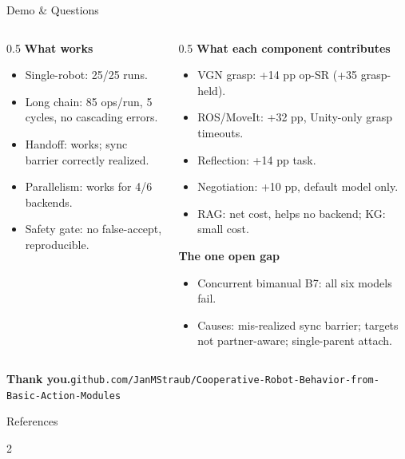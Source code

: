 \documentclass[aspectratio=169,11pt]{beamer}
\begin{document}
\begin{frame}{Demo \& Questions}
	\begin{columns}[T]
		\begin{column}{0.5\textwidth}
			\footnotesize
			\textbf{What works}
			\begin{itemize}\scriptsize
				\item Single-robot: 25/25 runs.
				\item Long chain: 85 ops/run, 5 cycles, no cascading errors.
				\item Handoff: works; sync barrier correctly realized.
				\item Parallelism: works for 4/6 backends.
				\item Safety gate: no false-accept, reproducible.
			\end{itemize}
		\end{column}
		\begin{column}{0.5\textwidth}
			\footnotesize
			\textbf{What each component contributes}
			\begin{itemize}\scriptsize
				\item VGN grasp: +14 pp op-SR (+35 grasp-held).
				\item ROS/MoveIt: +32 pp, Unity-only grasp timeouts.
				\item Reflection: +14 pp task.
				\item Negotiation: +10 pp, default model only.
				\item RAG: net cost, helps no backend; KG: small cost.
			\end{itemize}
			\vspace{0.3em}
			\textbf{The one open gap}
			\begin{itemize}\scriptsize
				\item Concurrent bimanual B7: all six models fail.
				\item Causes: mis-realized sync barrier; targets not partner-aware; single-parent attach.
			\end{itemize}
		\end{column}
	\end{columns}
	\vfill
	\centering \textbf{Thank you.}\quad\footnotesize\texttt{github.com/JanMStraub/Cooperative-Robot-Behavior-from-Basic-Action-Modules}
\end{frame}

\begin{frame}[t]{References}
	\begin{multicols}{2}
		
		
	\end{multicols}
\end{frame}
\end{document}
